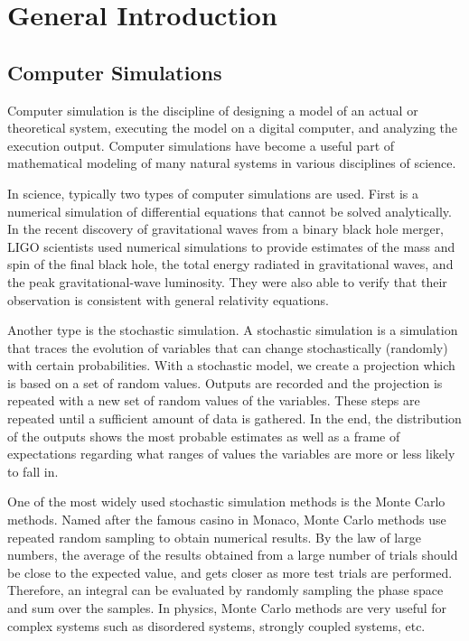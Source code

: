 \chapter{General Introduction}
\section{Computer Simulations}
Computer simulation is the discipline of designing a model of an actual or 
theoretical system, executing the model on a digital computer, and 
analyzing the execution output. Computer simulations have become a useful part of mathematical modeling of 
many natural systems in various disciplines of science. 

In science, typically two types of computer simulations are used. First is a 
numerical simulation of differential equations that cannot be solved 
analytically. In the recent discovery of gravitational waves from a binary
black hole merger, LIGO scientists \cite{PhysRevLett.116.061102} used numerical simulations to provide 
estimates of the mass and spin of the final black hole, the total energy 
radiated in gravitational waves, and the peak gravitational-wave luminosity.
They were also able to verify that their observation is consistent with general 
relativity equations.

Another type is the stochastic simulation. A stochastic simulation is a 
simulation that traces the evolution of variables that can change stochastically
 (randomly) with certain probabilities. With a stochastic model, we create a 
projection which is based on a set of  random values. 
Outputs are recorded and the projection is repeated with a new 
set of random values of the variables. These steps are repeated until a 
sufficient amount of data is gathered. In the end, the distribution of the 
outputs shows the most probable estimates as well as a frame of expectations 
regarding what ranges of values the variables are more or less likely to fall 
in. 

One of the most widely used stochastic simulation methods is the Monte Carlo
methods. Named after the famous casino in Monaco, Monte Carlo methods use
repeated random sampling to obtain numerical results. By the law of large 
numbers, the average of the results obtained from a large number of trials
should be close to the expected value, and gets closer as more test trials
are performed. Therefore, an integral can be evaluated by randomly sampling
the phase space and sum over the samples. 
In physics, Monte Carlo methods are very useful for complex systems such as 
disordered systems, strongly coupled systems, etc. 

